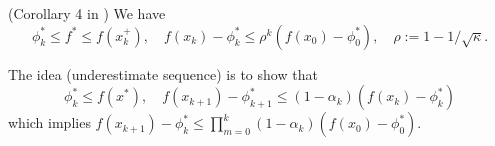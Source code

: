 \documentclass[12pt,english]{article}
\begin{document}
\begin{theorem}(Corollary 4 in \cite{JahaniGudapatiMa21})\label{thm:}
We have
%
\begin{equation}\label{eq:}
\phi^*_k \le f^* \le f(x_k^+),\quad f(x_k)-\phi^*_k \le \rho^k \left(f(x_0)-\phi^*_0\right), \quad \rho:=1-1/\sqrt{\kappa}.
\end{equation}
%
\end{theorem}
%
The idea (underestimate sequence) is to show that
%
\begin{equation}\label{eq:UES}
\phi^*_k \le f(x^*),\quad f(x_{k+1})-\phi^*_{k+1} \le (1-\alpha_k)\left(f(x_{k})-\phi^*_{k}\right) 
\end{equation}
%
which implies $f(x_{k+1})-\phi^*_{k} \le \prod_{m=0}^k(1-\alpha_k)\left(f(x_{0})-\phi^*_{0}\right)$.
\end{document}
